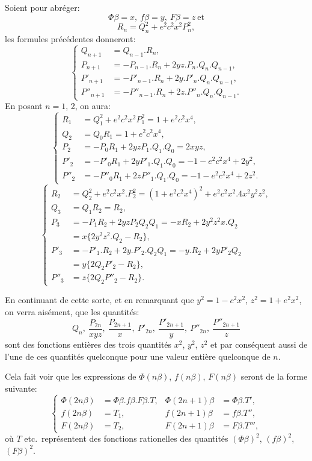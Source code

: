 \documentclass{article}
\begin{document}
Soient pour abréger:
\[ \Phi\beta=x,\ f\beta=y,\ F\beta=z\ \text{et} \tag{40.} \]
\[ R_n=Q_n^{2}+e^{2}c^{2}x^{2}P_n^{2}, \tag{41.} \]
les formules précédentes donneront:
\[ \left\{\begin{aligned} Q_{n+1}&=Q_{n-1}.R_n,\\ P_{n+1}&=-P_{n-1}.R_n+2yz.P_n.Q_n.Q_{n-1},\\ P'_{n+1}&=-P'_{n-1}.R_n+2y.P'_n.Q_n.Q_{n-1},\\ P''_{n+1}&=-P''_{n-1}.R_n+2z.P''_n.Q_n.Q_{n-1}. \end{aligned}\right. \tag{42.} \]
En posant $n=1$, 2, on aura:
\[ \left\{\begin{aligned} R_1&=Q_1^{2}+e^{2}c^{2}x^{2}P_1^{2}=1+e^{2}c^{2}x^{4},\\ Q_2&=Q_0R_1=1+e^{2}c^{2}x^{4},\\ P_2&=-P_0R_1+2yzP_1.Q_1.Q_0=2xyz,\\ P'_2&=-P'_0R_1+2yP'_1.Q_1.Q_0=-1-e^{2}c^{2}x^{4}+2y^{2},\\ P''_2&=-P''_0R_1+2zP''_1.Q_1.Q_0=-1-e^{2}c^{2}x^{4}+2z^{2}. \end{aligned}\right. \tag{43.} \]
\[ \left\{\begin{aligned} R_2&=Q_2^{2}+e^{2}c^{2}x^{2}.P_2^{2}=(1+e^{2}c^{2}x^{4})^{2}+e^{2}c^{2}x^{2}.4x^{2}y^{2}z^{2},\\ Q_3&=Q_1R_2=R_2,\\ P_3&=-P_1R_2+2yzP_2Q_2Q_1=-xR_2+2y^{2}z^{2}x.Q_2\\ &=x\{2y^{2}z^{2}.Q_2-R_2\},\\ P'_3&=-P'_1.R_2+2y.P'_2.Q_2Q_1=-y.R_2+2yP'_2Q_2\\ &=y\{2Q_2P'_2-R_2\},\\ P''_3&=z\{2Q_2P''_2-R_2\}. \end{aligned}\right. \tag{44.} \]

En continuant de cette sorte, et en remarquant que $y^{2}=1-c^{2}x^{2}$, $z^{2}=1+e^{2}x^{2}$, on verra aisément, que les quantités:
\[ Q_n,\ \frac{P_{2n}}{xyz},\ \frac{P_{2n+1}}{x},\ P'_{2n},\ \frac{P'_{2n+1}}{y},\ P''_{2n},\ \frac{P''_{2n+1}}{z} \]
sont des fonctions entières des trois quantités $x^{2}$, $y^{2}$, $z^{2}$ et par conséquent aussi de l'une de ces quantités quelconque pour une valeur entière quelconque de $n$.

Cela fait voir que les expressions de $\Phi(n\beta)$, $f(n\beta)$, $F(n\beta)$ seront de la forme suivante:
\[ \left\{\begin{aligned} \Phi(2n\beta)&=\Phi\beta.f\beta.F\beta.T, & \Phi(2n+1)\beta&=\Phi\beta.T',\\ f(2n\beta)&=T_1, & f(2n+1)\beta&=f\beta.T'',\\ F(2n\beta)&=T_2, & F(2n+1)\beta&=F\beta.T''', \end{aligned}\right. \tag{45.} \]
où $T$ etc.\ représentent des fonctions rationelles des quantités $(\Phi\beta)^{2}$, $(f\beta)^{2}$, $(F\beta)^{2}$.
\end{document}
